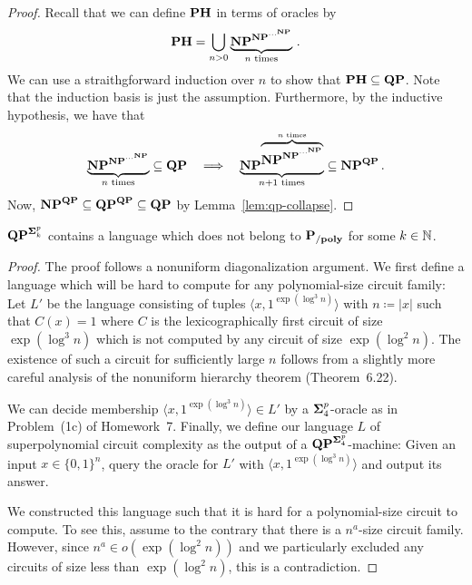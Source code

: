 \documentclass[11pt]{article}
\begin{document}
\begin{proof}
  Recall that we can define $\mathbf{PH}$ in terms of oracles by
  \[
    \mathbf{PH} =
    \bigcup_{n > 0} \underbrace{\mathbf{NP}^{\mathbf{NP}^{\cdots^{\mathbf{NP}}}}}_{n \textrm{ times}}
    \,.
  \]
  We can use a straithgforward induction over $n$ to show that
  $\mathbf{PH} \subseteq \mathbf{QP}$.
  Note that the induction basis is just the assumption.
  Furthermore, by the inductive hypothesis, we have that
  \[
    \underbrace{\mathbf{NP}^{\mathbf{NP}^{\cdots^{\mathbf{NP}}}}}_{n \textrm{ times}}
    \subseteq
    \mathbf{QP}
    \quad
    \Longrightarrow
    \quad
    \underbrace{\mathbf{NP}^{\overbrace{
      \mathbf{NP}^{\mathbf{NP}^{\cdots^{\mathbf{NP}}}}
    }^{n \textrm{ times}}}}_{n+1 \textrm{ times}}
    \subseteq
    \mathbf{NP}^{\mathbf{QP}} \,.
  \]
  Now, $\mathbf{NP}^{\mathbf{QP}} \subseteq \mathbf{QP}^{\mathbf{QP}} \subseteq\mathbf{QP} $
  by Lemma~\ref{lem:qp-collapse}.
\end{proof}

\begin{lemma}
	\label{lem:qp-super-circ}
	$\mathbf{QP}^{\mathbf{\Sigma}^p_k}$ contains a language which does not belong
	to $\mathbf{P_{/poly}}$ for some $k \in {\mathbb{N}}$.
\end{lemma}

\begin{proof}
	The proof follows a nonuniform diagonalization argument. We first define
	a language which will be hard to compute for any polynomial-size circuit
	family:
	Let $L'$ be the language consisting of tuples
	$\langle x, 1^{\exp(\log^3 n)} \rangle$
	with $n \coloneqq |x|$
	such that $C(x) = 1$ where $C$ is the
	lexicographically first circuit of size $\exp(\log^3 n)$ which is not
	computed by any circuit of size $\exp(\log^2 n)$.
	The existence of such a circuit for sufficiently large $n$ follows from a
	slightly more careful analysis of the nonuniform hierarchy theorem
	(Theorem~6.22).
	
	We can decide membership $\langle x, 1^{\exp(\log^3 n)} \rangle \in L'$
	by a $\mathbf{\Sigma}^p_4$-oracle as in Problem~(1c) of Homework~7.
	Finally, we define our language $L$ of superpolynomial circuit complexity
	as the output of a $\mathbf{QP}^{\mathbf{\Sigma}^p_4}$-machine: Given an input
	$x \in \{0,1\}^n$, query the oracle for $L'$ with
	$\langle x, 1^{\exp(\log^3 n)} \rangle$ and output its answer.
	
	We constructed this language such that it is hard for a polynomial-size
	circuit to compute. To see this, assume to the contrary that there is
	a $n^a$-size circuit family.
	However, since $n^a \in o(\exp(\log^2 n))$ and we particularly excluded any
	circuits of size less than $\exp(\log^2 n)$, this is a contradiction.
\end{proof}
\end{document}
